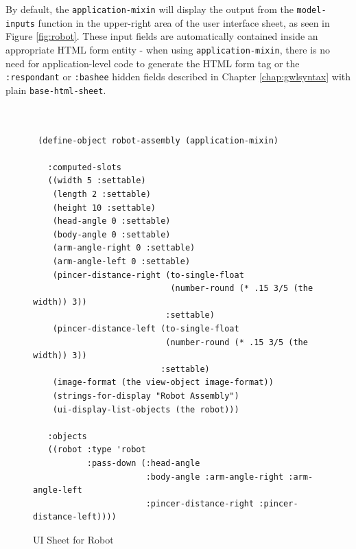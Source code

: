 \documentclass [11pt]{book}
\begin{document}
By default, the \texttt{application-mixin} will display the output from the \texttt{model-inputs} function in the upper-right area of the user interface sheet, as
seen in Figure 
\ref{fig:robot}. These input fields are automatically contained inside an appropriate
HTML form entity - when using \texttt{application-mixin}, there is no need for application-level code to generate the HTML form
tag or the \texttt{:respondant} or \texttt{:bashee} hidden fields described in Chapter 
\ref{chap:gwlsyntax} with plain \texttt{base-html-sheet}.
\begin{figure}
\begin{lrbox}{\boxedverb}
\begin{minipage}{\linewidth}

\begin{verbatim}


 (define-object robot-assembly (application-mixin)
  
   :computed-slots
   ((width 5 :settable)
    (length 2 :settable)
    (height 10 :settable)
    (head-angle 0 :settable)
    (body-angle 0 :settable)
    (arm-angle-right 0 :settable)
    (arm-angle-left 0 :settable)
    (pincer-distance-right (to-single-float 
                            (number-round (* .15 3/5 (the width)) 3)) 
                           :settable)
    (pincer-distance-left (to-single-float 
                           (number-round (* .15 3/5 (the width)) 3)) 
                          :settable)
    (image-format (the view-object image-format))
    (strings-for-display "Robot Assembly")
    (ui-display-list-objects (the robot)))

   :objects
   ((robot :type 'robot
           :pass-down (:head-angle 
                       :body-angle :arm-angle-right :arm-angle-left
                       :pincer-distance-right :pincer-distance-left))))

\end{verbatim}
\end{minipage}
\end{lrbox}
\fbox{\usebox{\boxedverb}}

\caption{UI Sheet for Robot}

\label{code:robot-toplevel}

\end{figure}
\end{document}
